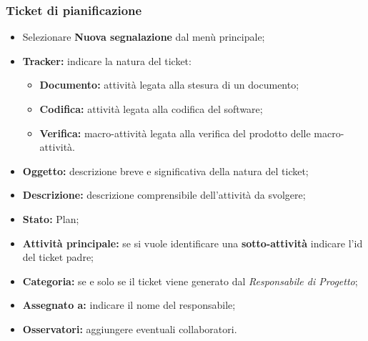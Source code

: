       \subsubsection{Ticket di pianificazione}
        \begin{itemize}
          \item Selezionare \textbf{Nuova segnalazione} dal menù principale;
          \item \textbf{Tracker: }indicare la natura del ticket:
          \bgroup
            \begin{itemize}
              \item \textbf{Documento: }attività legata alla stesura di un documento;
              \item \textbf{Codifica: }attività legata alla  codifica del software;
              \item \textbf{Verifica: }macro-attività legata alla verifica del prodotto delle macro-attività.
            \end{itemize}
          \egroup
          \item \textbf{Oggetto: }descrizione breve e significativa della natura del ticket;
          \item \textbf{Descrizione: }descrizione comprensibile dell'attività da svolgere;
          \item \textbf{Stato: }Plan;
          \item \textbf{Attività principale: }se si vuole identificare una \textbf{sotto-attività} indicare l'id del ticket padre;
          \item \textbf{Categoria: } se e solo se il ticket viene generato dal \emph{Responsabile di Progetto};
          \item \textbf{Assegnato a: }indicare il nome del responsabile;
          \item \textbf{Osservatori: }aggiungere eventuali collaboratori.
        \end{itemize}
